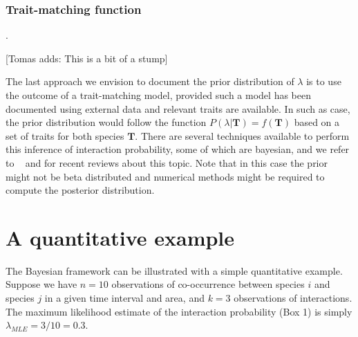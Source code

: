 \documentclass[12pt]{article}
\begin{document}
      \subsubsection*{Trait-matching function}. 

          [Tomas adds: This is a bit of a stump]

          The last approach we envision to document the prior distribution of $\lambda$ is to use the outcome of a trait-matching model, provided such a model has been documented using external data and relevant traits are available. 
          In such as case, the prior distribution would follow the function $P(\lambda|\mathbf{T})=f(\mathbf{T})$ based on a set of traits for both species $\mathbf{T}$. There are several techniques available to perform this inference of interaction probability, some of which are bayesian, and we refer to ~\citep{Bartomeus2016} and \citep{Weinstein2017} for recent reviews about this topic. Note that in this case the prior might not be beta distributed and numerical methods might be required to compute the posterior distribution.  


\section*{A quantitative example}


  The Bayesian framework can be illustrated with a simple quantitative example. Suppose we have $n = 10$ observations of co-occurrence between species $i$ and species $j$ in a given time interval and area, and $k = 3$ observations of interactions. The maximum likelihood estimate of the interaction probability (Box 1) is simply $\lambda_{MLE} = 3/10 = 0.3$. 
  
\end{document}
